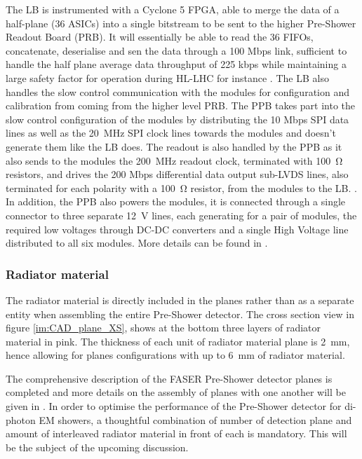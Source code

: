					The LB is instrumented with a Cyclone 5 FPGA, able to merge the data of a half-plane (36 ASICs) into a single bitstream to be sent to the higher Pre-Shower Readout Board (PRB). It will essentially be able to read the 36 FIFOs, concatenate, deserialise and sen the data through a 100 Mbps link, sufficient to handle the half plane average data throughput of 225 kbps while maintaining a large safety factor for operation during HL-LHC for instance \cite{PreShower_TP}. The LB also handles the slow control communication with the modules for configuration and calibration from coming from the higher level PRB. 
					The PPB takes part into the slow control configuration of the modules by distributing the 10 Mbps SPI data lines as well as the \SI{20}{\mega\hertz} SPI clock lines towards the modules and doesn't generate them like the LB does. The readout is also handled by the PPB as it also sends to the modules the \SI{200}{\mega\hertz} readout clock, terminated with \SI{100}{\ohm} resistors, and drives the 200 Mbps differential data output sub-LVDS lines, also terminated for each polarity with a \SI{100}{\ohm} resistor, from the modules to the LB. . In addition, the PPB also powers the modules, it is connected through a single connector to three separate \SI{12}{\volt} lines, each generating for a pair of modules, the required low voltages through DC-DC converters and a single High Voltage line distributed to all six modules. More details can be found in .   
				
				\subsubsection{Radiator material}
				The radiator material is directly included in the planes rather than as a separate entity when assembling the entire Pre-Shower detector. The cross section view in figure \ref{im:CAD_plane_XS}, shows at the bottom three layers of radiator material in pink. The thickness of each unit of radiator material plane is \SI{2}{\milli\meter}, hence allowing for planes configurations with up to \SI{6}{\milli\meter} of radiator material.   
		
		The comprehensive description of the FASER Pre-Shower detector planes is completed and more details on the assembly of planes with one another will be given in . In order to optimise the performance of the Pre-Shower detector for di-photon EM showers, a thoughtful combination of number of detection plane and amount of interleaved radiator material in front of each is mandatory. This will be the subject of the upcoming discussion.    
		\clearpage
		

